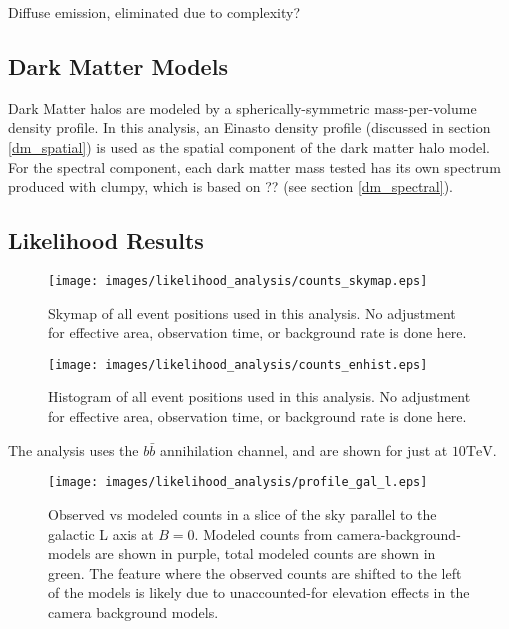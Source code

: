  Diffuse emission, eliminated due to complexity?

  \subsection{Dark Matter Models}
  Dark Matter halos are modeled by a spherically-symmetric mass-per-volume density profile.
  In this analysis, an Einasto density profile (discussed in section \ref{dm_spatial}) is used as the spatial component of the dark matter halo model.
  For the spectral component, each dark matter mass tested has its own spectrum produced with clumpy, which is based on ?? (see section \ref{dm_spectral}).

  \subsection{Likelihood Results}
  
  \begin{figure}[ht]
    \begin{center}
      \texttt{[image: images/likelihood\_analysis/counts\_skymap.eps]}
      \caption[Galactic Center Counts Skymap]{Skymap of all event positions used in this analysis.  No adjustment for effective area, observation time, or background rate is done here.}\label{fig:gc_counts_skymap}
    \end{center}
  \end{figure}

  \begin{figure}[ht]
    \begin{center}
      \texttt{[image: images/likelihood\_analysis/counts\_enhist.eps]}
      \caption[Galactic Center Counts Energy Histogram]{Histogram of all event positions used in this analysis.  No adjustment for effective area, observation time, or background rate is done here.}\label{fig:gc_counts_enhist}
    \end{center}
  \end{figure}

  The analysis uses the $b\bar{b}$ annihilation channel, and are shown for just at $10\text{TeV}$.
  
  \begin{figure}[ht]
    \begin{center}
      \texttt{[image: images/likelihood\_analysis/profile\_gal\_l.eps]}
      \caption[Galactic Center Profile vs Galactic L]{Observed vs modeled counts in a slice of the sky parallel to the galactic L axis at $B=0$.  Modeled counts from camera-background-models are shown in purple, total modeled counts are shown in green.  The feature where the observed counts are shifted to the left of the models is likely due to unaccounted-for elevation effects in the camera background models.}\label{fig:gc_profile_gal_l}
    \end{center}
  \end{figure}

